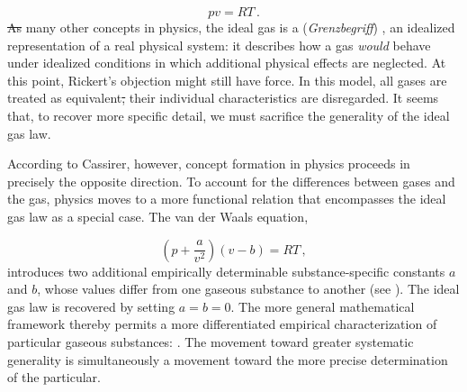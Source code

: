 \documentclass[submitted,12pt]{article}
\providecommand{\DIFadd}[1]{{\protect\color{blue}\uwave{#1}}} %
\providecommand{\DIFdel}[1]{{\protect\color{red}\sout{#1}}}                      %
\providecommand{\DIFaddbegin}{} %
\providecommand{\DIFaddend}{} %
\providecommand{\DIFdelbegin}{} %
\providecommand{\DIFdelend}{} %
\begin{document}
\begin{equation*}
pv=RT\,.  
\end{equation*}
%
\DIFdelbegin \DIFdel{As }\DIFdelend \DIFaddbegin \DIFadd{Like }\DIFaddend many other concepts in physics, the ideal gas is a \DIFdelbegin %
\DIFdelend \DIFaddbegin {} \DIFaddend (\emph{Grenzbegriff}) , an idealized representation of a real physical system: it describes how a gas \emph{would} behave under idealized conditions in which additional physical effects are neglected. At this point, Rickert's objection might still have force. In this model, all gases are treated as equivalent\DIFdelbegin \DIFdel{, }\DIFdelend \DIFaddbegin \DIFadd{; }\DIFaddend their individual characteristics are disregarded. It seems that, to recover more specific detail, we must sacrifice the generality of the ideal gas law.

According to Cassirer, however, concept formation in physics proceeds in precisely the opposite direction. To account for the differences between  gases and the  gas, physics moves to a more  functional relation that encompasses the ideal gas law as a special case. The van der Waals equation, 

\begin{equation*}
\left(p+\frac{a}{v^2}\right)(v-b)=RT\,,
\end{equation*}
%
introduces two additional empirically determinable substance-specific constants $a$ and $b$, whose values differ from one gaseous substance to another (see ). The ideal gas law is recovered by setting $a=b=0$. The more general mathematical framework thereby permits a more differentiated empirical characterization of particular gaseous substances:  . The movement toward greater systematic generality is simultaneously a movement toward the more precise determination of the particular.
\end{document}
